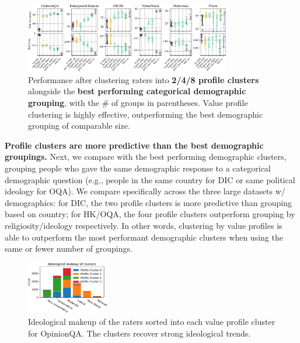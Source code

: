 \documentclass[11pt]{article}
\begin{document}
\begin{figure}[t]
\centering
\includegraphics[width=0.8\textwidth]{files/clustering.pdf}
\caption{
Performance after clustering raters into \textcolor{clustcol}{\bf 2/4/8 profile clusters} alongside the \textcolor{demcolor}{\bf best performing categorical demographic grouping}, with the \# of groups in parentheses.
Value profile clustering is highly effective, outperforming the best demographic grouping of comparable size.
}
\label{fig:clusteringresults}
\end{figure}

\textbf{Profile clusters are more predictive than the best demographic groupings.}
Next, we compare with the best performing demographic clusters, grouping people who gave the same demographic response to a categorical demographic question (e.g., people in the same country for DIC or same political ideology for OQA). We compare specifically across the three large datasets w/ demographics: for DIC, the two profile clusters is more predictive than grouping based on country; for HK/OQA, the four profile clusters outperform grouping by religiosity/ideology respectively. In other words, clustering by value profiles is able to outperform the most performant
demographic clusters when using the same or fewer number of groupings.

\begin{figure}
\centering
\includegraphics[width=0.32\textwidth]{files/ideology.pdf}
\vspace{-5pt}
\caption{Ideological makeup of the raters sorted into each value profile cluster for OpinionQA. The clusters recover strong ideological trends.}
\label{fig:ideology}
\vspace{-6pt}
\end{figure}
\end{document}
